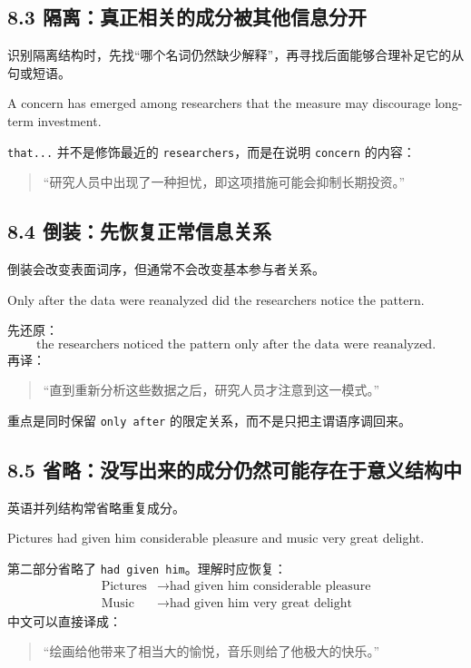 \documentclass[11pt,a4paper]{ctexart}
\begin{document}
\subsection{8.3 隔离：真正相关的成分被其他信息分开}
识别隔离结构时，先找“哪个名词仍然缺少解释”，再寻找后面能够合理补足它的从句或短语。

\begin{eng}[例 20]
A concern has emerged among researchers that the measure may discourage long-term investment.
\end{eng}
\texttt{that...} 并不是修饰最近的 \texttt{researchers}，而是在说明 \texttt{concern} 的内容：
\begin{quote}
“研究人员中出现了一种担忧，即这项措施可能会抑制长期投资。”
\end{quote}

\subsection{8.4 倒装：先恢复正常信息关系}
倒装会改变表面词序，但通常不会改变基本参与者关系。

\begin{eng}[例 21]
Only after the data were reanalyzed did the researchers notice the pattern.
\end{eng}
先还原：
\[
\text{the researchers noticed the pattern only after the data were reanalyzed}.
\]
再译：
\begin{quote}
“直到重新分析这些数据之后，研究人员才注意到这一模式。”
\end{quote}
重点是同时保留 \texttt{only after} 的限定关系，而不是只把主谓语序调回来。

\subsection{8.5 省略：没写出来的成分仍然可能存在于意义结构中}
英语并列结构常省略重复成分。

\begin{eng}[例 22]
Pictures had given him considerable pleasure and music very great delight.
\end{eng}
第二部分省略了 \texttt{had given him}。理解时应恢复：
\[
\begin{aligned}
\text{Pictures} &\rightarrow \text{had given him considerable pleasure}\\
\text{Music} &\rightarrow \text{had given him very great delight}
\end{aligned}
\]
中文可以直接译成：
\begin{quote}
“绘画给他带来了相当大的愉悦，音乐则给了他极大的快乐。”
\end{quote}
\end{document}
